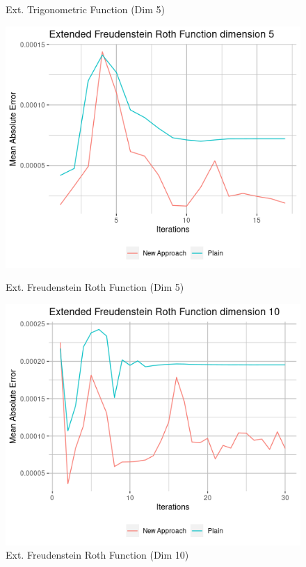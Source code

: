 \documentclass{article}
\begin{document}
\begin{figure}[H]
\begin{minipage}[b]{0.5\linewidth}
		\caption{Ext. Trigonometric Function (Dim 5)} 
		\vspace{4ex}
	\end{minipage} 
	\begin{minipage}[b]{0.5\linewidth}
	\centering
	\includegraphics[scale=0.5]{plots/Extended_Freudenstein_Roth_dim5.png} 
	\caption{Ext. Freudenstein Roth Function (Dim 5)} 
	\vspace{4ex}
\end{minipage}%
\begin{minipage}[b]{0.5\linewidth}
	\centering
	\includegraphics[scale=0.5]{plots/Extended_Freudenstein_Roth_dim10.png} 
	\caption{Ext. Freudenstein Roth Function (Dim 10)} 
	\vspace{4ex}
\end{minipage} 
\end{figure}
\end{document}
